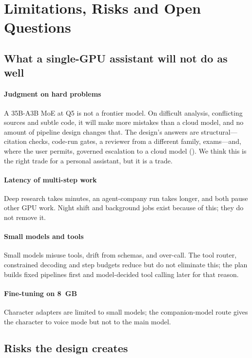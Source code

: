 \section{Limitations, Risks and Open Questions}
\label{sec:limitations}

\subsection{What a single-GPU assistant will not do as well}

\paragraph{Judgment on hard problems} A 35B-A3B MoE at Q5 is not a frontier model. On difficult analysis, conflicting sources and subtle code, it will make more mistakes than a cloud model, and no amount of pipeline design changes that. The design's answers are structural---citation checks, code-run gates, a reviewer from a different family, exams---and, where the user permits, governed escalation to a cloud model (). We think this is the right trade for a personal assistant, but it is a trade.

\paragraph{Latency of multi-step work} Deep research takes minutes, an agent-company run takes longer, and both pause other GPU work. Night shift and background jobs exist because of this; they do not remove it.

\paragraph{Small models and tools} Small models misuse tools, drift from schemas, and over-call. The tool router, constrained decoding and step budgets reduce but do not eliminate this; the plan builds fixed pipelines first and model-decided tool calling later for that reason.

\paragraph{Fine-tuning on 8~GB} Character adapters are limited to small models; the companion-model route gives the character to voice mode but not to the main model.

\subsection{Risks the design creates}

